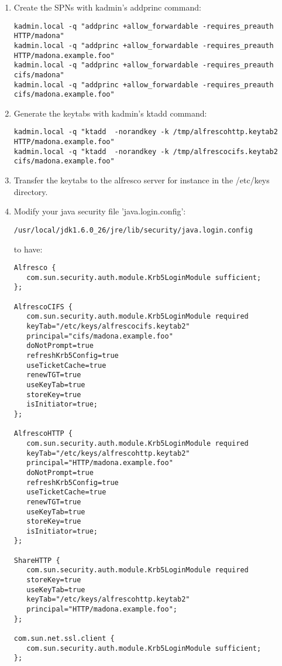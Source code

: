 \documentclass[12pt,a4]{article}
\begin{document}
\begin{enumerate}
\item Create the SPNs with kadmin's  addprinc command: 

\begin{verbatim}
kadmin.local -q "addprinc +allow_forwardable -requires_preauth HTTP/madona"
kadmin.local -q "addprinc +allow_forwardable -requires_preauth HTTP/madona.example.foo"
kadmin.local -q "addprinc +allow_forwardable -requires_preauth cifs/madona"
kadmin.local -q "addprinc +allow_forwardable -requires_preauth cifs/madona.example.foo"
\end{verbatim}

\item Generate the keytabs  with kadmin's ktadd command: 

\begin{verbatim}
kadmin.local -q "ktadd  -norandkey -k /tmp/alfrescohttp.keytab2 HTTP/madona.example.foo"
kadmin.local -q "ktadd  -norandkey -k /tmp/alfrescocifs.keytab2 cifs/madona.example.foo"
\end{verbatim}

\item Transfer the keytabs to the alfresco server for instance in the /etc/keys directory.
\item Modify your java security file 'java.login.config':
\begin{verbatim}
/usr/local/jdk1.6.0_26/jre/lib/security/java.login.config
\end{verbatim}
to have:
\begin{verbatim}
Alfresco {
   com.sun.security.auth.module.Krb5LoginModule sufficient;
};

AlfrescoCIFS {
   com.sun.security.auth.module.Krb5LoginModule required
   keyTab="/etc/keys/alfrescocifs.keytab2"
   principal="cifs/madona.example.foo"
   doNotPrompt=true
   refreshKrb5Config=true
   useTicketCache=true
   renewTGT=true
   useKeyTab=true
   storeKey=true
   isInitiator=true;
};

AlfrescoHTTP {
   com.sun.security.auth.module.Krb5LoginModule required
   keyTab="/etc/keys/alfrescohttp.keytab2"
   principal="HTTP/madona.example.foo"
   doNotPrompt=true
   refreshKrb5Config=true
   useTicketCache=true
   renewTGT=true
   useKeyTab=true
   storeKey=true
   isInitiator=true;
};

ShareHTTP {
   com.sun.security.auth.module.Krb5LoginModule required
   storeKey=true
   useKeyTab=true
   keyTab="/etc/keys/alfrescohttp.keytab2"
   principal="HTTP/madona.example.foo";
};

com.sun.net.ssl.client {
   com.sun.security.auth.module.Krb5LoginModule sufficient;
};


\end{verbatim}
\end{enumerate}
\end{document}
